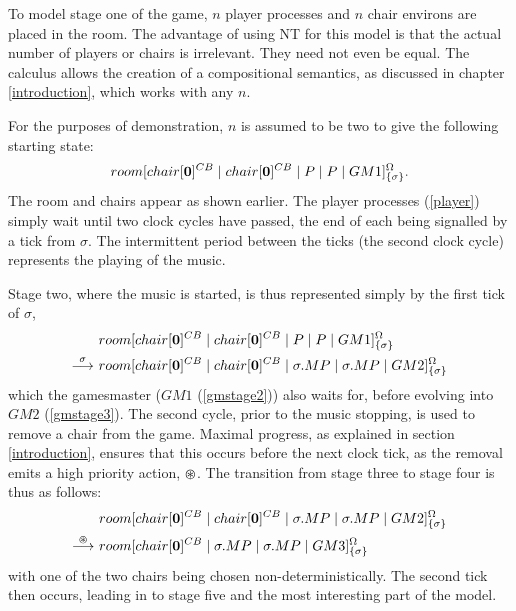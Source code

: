 To model stage one of the game, $n$ player processes and $n$ chair
environs are placed in the room.  The advantage of using NT for this
model is that the actual number of players or chairs is irrelevant.
They need not even be equal.  The calculus allows the creation of a
compositional semantics, as discussed in chapter \ref{introduction},
which works with any $n$.

For the purposes of demonstration, $n$ is assumed to be two to give the
following starting state:
\begin{equation}
  {room}[ {chair}[ \textbf{0} ]^{CB} \;|\; {chair}[ \textbf{0} ]^{CB} \;|\; 
   P \;|\; P \;|\; GM1 ]^{\Omega}_{\{\sigma\}}.
\end{equation}
The room and chairs appear as shown earlier.  The player
processes (\ref{player}) simply wait until two clock
cycles have passed, the end of each being signalled by a tick from
$\sigma$.  The intermittent period between the ticks (the second clock
cycle) represents the playing of the music.  

Stage two, where the music is started, is thus represented simply by the
first tick of $\sigma$,
\begin{equation}
\begin{aligned}
  & {room}[ {chair}[ \textbf{0} ]^{CB} \;|\; {chair}[ \textbf{0} ]^{CB} \;|\; 
   P \;|\; P \;|\;
   GM1 ]^{\Omega}_{\{\sigma\}} \\
 \stackrel{\sigma}{\longrightarrow}\ & {room}[ {chair}[ \textbf{0} ]^{CB} \;|\; {chair}[ \textbf{0} ]^{CB} \;|\; 
   \sigma.MP \;|\; \sigma.MP \;|\;
   GM2 ]^{\Omega}_{\{\sigma\}}
\end{aligned}
\end{equation}
which the gamesmaster ($GM1$ (\ref{gmstage2})) also waits for, before
evolving into $GM2$ (\ref{gmstage3}).  The second cycle, prior to the
music stopping, is used to remove a chair from the game.  Maximal
progress, as explained in section \ref{introduction}, ensures that this
occurs before the next clock tick, as the removal emits a high priority
action, $\varoast$.  The transition from stage three to stage four is thus
as follows:
\begin{equation}
\begin{aligned}
& {room}[ {chair}[ \textbf{0} ]^{CB} \;|\; {chair}[ \textbf{0} ]^{CB} \;|\; 
   \sigma.MP \;|\; \sigma.MP \;|\;
   GM2 ]^{\Omega}_{\{\sigma\}} \\
 \stackrel{\varoast}{\longrightarrow}\ & {room}[ {chair}[ \textbf{0} ]^{CB} \;|\; 
   \sigma.MP \;|\; \sigma.MP \;|\;
   GM3 ]^{\Omega}_{\{\sigma\}}
\end{aligned}
\end{equation}
with one of the two chairs being chosen non-deterministically.
The second tick then occurs, leading in to stage five and the most
interesting part of the model.

